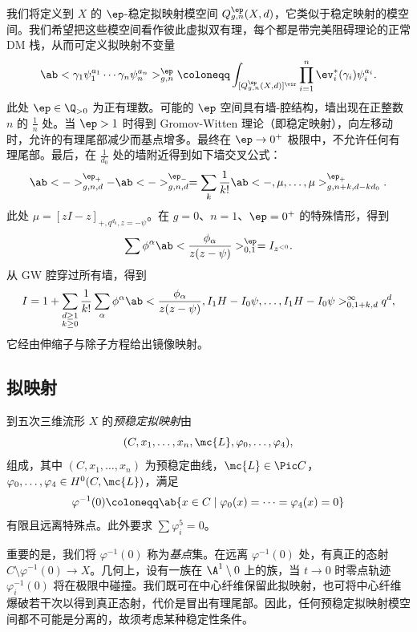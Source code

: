 我们将定义到 \(X\) 的 \(\ep\)-稳定拟映射模空间 \(Q_{g,n}^{\ep}(X, d)\)，它类似于稳定映射的模空间。我们希望把这些模空间看作彼此虚拟双有理，每个都是带完美阻碍理论的正常 DM 栈，从而可定义拟映射不变量
\[ \ab< \gamma_1 \psi_1^{a_1} \cdots \gamma_n \psi_n^{a_n}>_{g,n}^{\ep} \coloneqq \int_{[Q_{g,n}^{\ep}(X,d)]^{\vir}} \prod_{i=1}^n \ev_i^*(\gamma_i) \psi_i^{a_i}. \]
此处 \(\ep \in \Q_{>0}\) 为正有理数。可能的 \(\ep\) 空间具有墙-腔结构，墙出现在正整数 \(n\) 的 \(\frac{1}{n}\) 处。当 \(\ep > 1\) 时得到 Gromov-Witten 理论（即稳定映射），向左移动时，允许的有理尾部减少而基点增多。最终在 \(\ep \to 0^+\) 极限中，不允许任何有理尾部。最后，在 \(\frac{1}{d_0}\) 处的墙附近得到如下墙交叉公式：
\[ \ab<->_{g,n,d}^{\ep_+} - \ab<->_{g,n,d}^{\ep_-} = \sum_{k} \frac{1}{k!} \ab<-, \mu, \ldots, \mu>_{g,n+k, d-kd_0}^{\ep_+}. \]
此处 \(\mu = [zI-z]_{+, q^{d_0}, z=-\psi}\)。在 \(g = 0\)、\(n = 1\)、\(\ep = 0^+\) 的特殊情形，得到
\[ \sum \phi^{\alpha} \ab<\frac{\phi_{\alpha}}{z(z-\psi)}>^{\ep}_{0,1} = I_{z^{<0}}. \]
从 GW 腔穿过所有墙，得到
\[ I = 1 + \sum_{\substack{d \geq 1 \\ k \geq 0}} \frac{1}{k!} \sum_{\alpha} \phi^{\alpha} \ab< \frac{\phi_{\alpha}}{z(z-\psi)}, I_1 H - I_0 \psi, \ldots, I_1 H - I_0 \psi>_{0,1+k,d}^{\infty} q^d, \]
它经由伸缩子与除子方程给出镜像映射。

\subsection{拟映射}%
\label{sub:Quasimaps}

\begin{defn}
    到五次三维流形 \(X\) 的\textit{预稳定拟映射}由
    \[(C, x_1, \ldots, x_n, \mc{L}, \varphi_0, \ldots, \varphi_4),\]
    组成，其中 \((C, x_1, \ldots, x_n)\) 为预稳定曲线，\(\mc{L} \in \Pic C\)，\(\varphi_0, \ldots, \varphi_4 \in H^0(C, \mc{L})\)，满足
    \[ \varphi^{-1}(0) \coloneqq \ab\{x \in C \mid \varphi_0(x) = \cdots = \varphi_4(x) = 0 \} \]
    有限且远离特殊点。此外要求 \(\sum \varphi_i^5 = 0\)。
\end{defn}

重要的是，我们将 \(\varphi^{-1}(0)\) 称为\textit{基点}集。在远离 \(\varphi^{-1}(0)\) 处，有真正的态射 \(C \setminus \varphi^{-1}(0) \to X\)。几何上，设有一族在 \(\A^1 \setminus 0\) 上的族，当 \(t \to 0\) 时零点轨迹 \(\varphi_i^{-1}(0)\) 将在极限中碰撞。我们既可在中心纤维保留此拟映射，也可将中心纤维爆破若干次以得到真正态射，代价是冒出有理尾部。因此，任何预稳定拟映射模空间都不可能是分离的，故须考虑某种稳定性条件。

